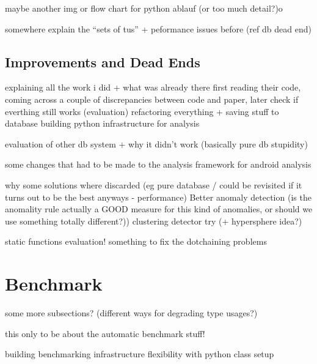 maybe another img or flow chart for python ablauf (or too much detail?)o

somewhere explain the ``sets of tus'' + peformance issues before (ref db dead end)

\subsection{Improvements and Dead Ends}

explaining all the work i did + what was already there
    first reading their code, coming across a couple of discrepancies between code and paper, later check if everthing still works (evaluation)
    refactoring everything + saving stuff to database
    building python infrastructure for analysis

evaluation of other db system + why it didn't work (basically pure db stupidity)

some changes that had to be made to the analysis framework for android analysis

why some solutions where discarded (eg pure database / could be revisited if it turns out to be the best anyways - performance)
Better anomaly detection (is the anomality rule actually a GOOD measure for this kind of anomalies, or should we use something totally different?))
    clustering detector try (+ hypersphere idea?)

static functions evaluation!
something to fix the dotchaining problems

\section{Benchmark}
some more subsections? (different ways for degrading type usages?)

this only to be about the automatic benchmark stuff!

building benchmarking infrastructure
flexibility with python class setup
